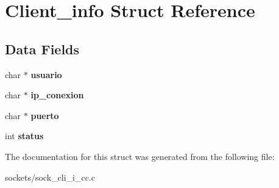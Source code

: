\hypertarget{struct_client__info}{}\section{Client\+\_\+info Struct Reference}
\label{struct_client__info}
\subsection*{Data Fields}
\begin{DoxyCompactItemize}
\item 
char $\ast$ {\bfseries usuario}\hypertarget{struct_client__info_a0147a5b81499984f9cb00379a8cb84af}{}\label{struct_client__info_a0147a5b81499984f9cb00379a8cb84af}

\item 
char $\ast$ {\bfseries ip\+\_\+conexion}\hypertarget{struct_client__info_a823a62b2c586c74b288d3559d0bf8892}{}\label{struct_client__info_a823a62b2c586c74b288d3559d0bf8892}

\item 
char $\ast$ {\bfseries puerto}\hypertarget{struct_client__info_a00d07fc5e9ef3fceba4bc71080fa3bfc}{}\label{struct_client__info_a00d07fc5e9ef3fceba4bc71080fa3bfc}

\item 
int {\bfseries status}\hypertarget{struct_client__info_a6e27f49150e9a14580fb313cc2777e00}{}\label{struct_client__info_a6e27f49150e9a14580fb313cc2777e00}

\end{DoxyCompactItemize}


The documentation for this struct was generated from the following file\+:\begin{DoxyCompactItemize}
\item 
sockets/sock\+\_\+cli\+\_\+i\+\_\+cc.\+c\end{DoxyCompactItemize}
